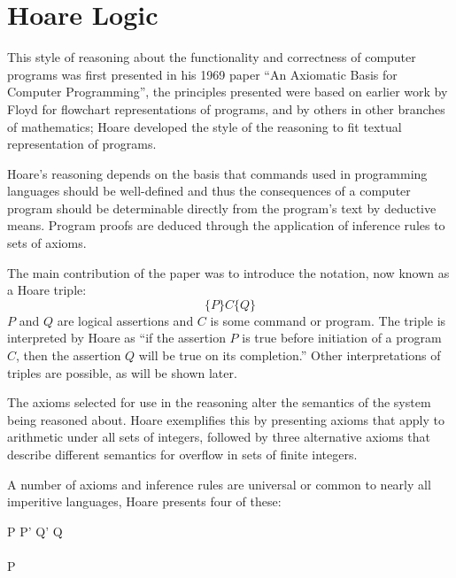 \documentclass[a4paper,notitlepage]{report}
\begin{document}

\section{Hoare Logic}
  This style of reasoning about the functionality and correctness of computer
  programs was first presented in his 1969 paper ``An Axiomatic Basis for
  Computer Programming''\cite{Hoare1969Axiom}, the principles presented were
  based on earlier work by Floyd\cite{floyd1967assigning} for flowchart
  representations of programs, and by others in other branches of mathematics;
  Hoare developed the style of the reasoning to fit textual representation of
  programs.

  Hoare's reasoning depends on the basis that commands used in programming
  languages should be well-defined and thus the consequences of a computer
  program should be determinable directly from the program's text by deductive
  means. Program proofs are deduced through the application of inference rules
  to sets of axioms.

  The main contribution of the paper was to introduce the notation, now known as
  a Hoare triple:
    \[ \{P\} C \{Q\} \]
  $P$ and $Q$ are logical assertions and $C$ is some command or program. The
  triple is interpreted by Hoare as ``if the assertion $P$ is true before
  initiation of a program $C$, then the assertion $Q$ will be true on its
  completion.'' Other interpretations of triples are possible, as will be shown
  later.

  The axioms selected for use in the reasoning alter the semantics of the system
  being reasoned about. Hoare exemplifies this by presenting axioms that apply
  to arithmetic under all sets of integers, followed by three alternative axioms
  that describe different semantics for overflow in sets of finite integers.

  A number of axioms and inference rules are universal or common to nearly all
  imperitive languages, Hoare presents four of these:
  \begin{display}{}
    {} \qquad

    { \quad P \impl P' \quad Q' \impl Q}
    {} \\
    \\
    {P \quad {}}
    {} \qquad

    { \quad {}}
    {}
  \end{display}
\end{document}
